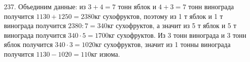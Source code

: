 237. Объединим данные: из $3+4=7$ тонн яблок и $4+3=7$ тонн винограда получится $1130+1250=2380$кг сухофруктов, поэтому из 1 т яблок и 1 т винограда получится $2380:7=340$кг сухофруктов, а значит из 5 т яблок и 5 т винограда получится $340\cdot5=1700$кг сухофруктов. Из 3 тонн винограда и 3 тонн яблок получится $340\cdot3=1020$кг сухофруктов, значит из 1 тонны винограда получится $1130-1020=110$кг изюма.\\

